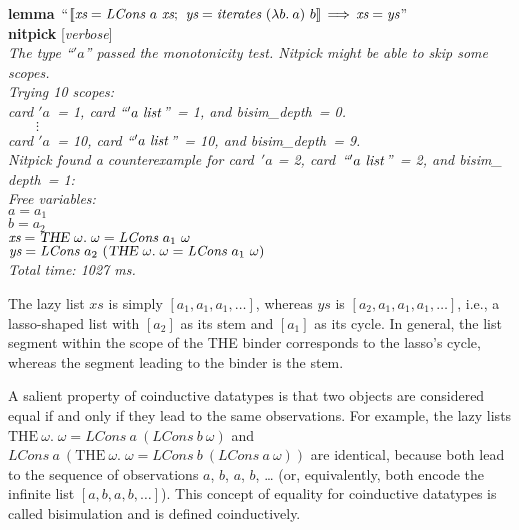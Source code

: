 \documentclass[a4paper,12pt]{article}
\begin{document}
\prew
\textbf{lemma}~``$\mathopen{[\![}\textit{xs} = \textit{LCons}~a~\textit{xs};\>\,
\textit{ys} = \textit{iterates}~(\lambda b.\> a)~b\mathclose{]\!]} \,\Longrightarrow\, \textit{xs} = \textit{ys}$'' \\
\textbf{nitpick} [\textit{verbose}] \\[2\smallskipamount]
\slshape The type ``\kern1pt$'a$'' passed the monotonicity test. Nitpick might be able to skip
some scopes. \\[2\smallskipamount]
Trying 10 scopes: \\
\hbox{}\qquad \textit{card} $'a$~= 1, \textit{card} ``\kern1pt$'a~\textit{list\/}$''~= 1,
and \textit{bisim\_depth}~= 0. \\
\hbox{}\qquad $\qquad\vdots$ \\[.5\smallskipamount]
\hbox{}\qquad \textit{card} $'a$~= 10, \textit{card} ``\kern1pt$'a~\textit{list\/}$''~= 10,
and \textit{bisim\_depth}~= 9. \\[2\smallskipamount]
Nitpick found a counterexample for {\itshape card}~$'a$ = 2,
\textit{card}~``\kern1pt$'a~\textit{list\/}$''~= 2, and \textit{bisim\_\allowbreak
depth}~= 1:
\\[2\smallskipamount]
\hbox{}\qquad Free variables: \nopagebreak \\
\hbox{}\qquad\qquad $\textit{a} = a_1$ \\
\hbox{}\qquad\qquad $\textit{b} = a_2$ \\
\hbox{}\qquad\qquad $\textit{xs} = \textsl{THE}~\omega.\; \omega = \textit{LCons}~a_1~\omega$ \\
\hbox{}\qquad\qquad $\textit{ys} = \textit{LCons}~a_2~(\textsl{THE}~\omega.\; \omega = \textit{LCons}~a_1~\omega)$ \\[2\smallskipamount]
Total time: 1027 ms.
\postw

The lazy list $\textit{xs}$ is simply $[a_1, a_1, a_1, \ldots]$, whereas
$\textit{ys}$ is $[a_2, a_1, a_1, a_1, \ldots]$, i.e., a lasso-shaped list with
$[a_2]$ as its stem and $[a_1]$ as its cycle. In general, the list segment
within the scope of the {THE} binder corresponds to the lasso's cycle, whereas
the segment leading to the binder is the stem.

A salient property of coinductive datatypes is that two objects are considered
equal if and only if they lead to the same observations. For example, the lazy
lists $\textrm{THE}~\omega.\; \omega =
\textit{LCons}~a~(\textit{LCons}~b~\omega)$ and
$\textit{LCons}~a~(\textrm{THE}~\omega.\; \omega =
\textit{LCons}~b~(\textit{LCons}~a~\omega))$ are identical, because both lead
to the sequence of observations $a$, $b$, $a$, $b$, \hbox{\ldots} (or,
equivalently, both encode the infinite list $[a, b, a, b, \ldots]$). This
concept of equality for coinductive datatypes is called bisimulation and is
defined coinductively.
\end{document}
